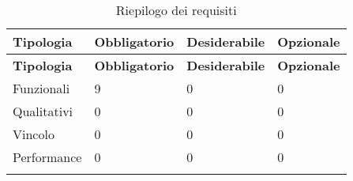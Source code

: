 \def\arraystretch{1.5}
\begin{longtable}{p{2.5cm}!{\VRule[1pt]}p{2.5cm}!{\VRule[1pt]}p{2.5cm}!{\VRule[1pt]}p{2.5cm}}
\color{white} \textbf{Tipologia} & \color{white} \textbf{Obbligatorio} & \color{white} \textbf{Desiderabile} & \color{white} \textbf{Opzionale} \\ 
\endfirsthead 
{} 
\color{white} \textbf{Tipologia} & \color{white} \textbf{Obbligatorio} & \color{white} \textbf{Desiderabile} & \color{white} \textbf{Opzionale} \\ 
\endhead 
Funzionali & 9 & 0 & 0\\Qualitativi & 0 & 0 & 0\\Vincolo & 0 & 0 & 0\\Performance & 0 & 0 & 0\\
\caption{Riepilogo dei requisiti}
\end{longtable}